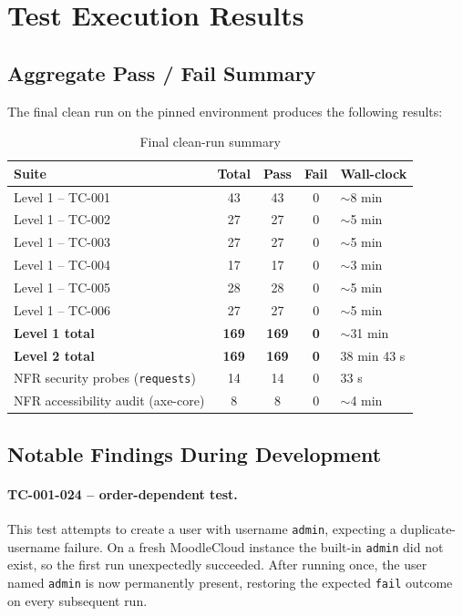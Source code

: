 \documentclass[twoside,final]{hcmut-report}
\begin{document}
\section{Test Execution Results}

\subsection{Aggregate Pass / Fail Summary}
The final clean run on the pinned environment produces the following results:

\begin{table}[H]
\centering
\renewcommand{\arraystretch}{1.3}
\begin{tabularx}{\textwidth}{|l|c|c|c|X|}
\hline
\textbf{Suite} & \textbf{Total} & \textbf{Pass} & \textbf{Fail} & \textbf{Wall-clock} \\ \hline
Level 1 -- TC-001 & 43 & 43 & 0 & $\sim$8 min \\ \hline
Level 1 -- TC-002 & 27 & 27 & 0 & $\sim$5 min \\ \hline
Level 1 -- TC-003 & 27 & 27 & 0 & $\sim$5 min \\ \hline
Level 1 -- TC-004 & 17 & 17 & 0 & $\sim$3 min \\ \hline
Level 1 -- TC-005 & 28 & 28 & 0 & $\sim$5 min \\ \hline
Level 1 -- TC-006 & 27 & 27 & 0 & $\sim$5 min \\ \hline
\textbf{Level 1 total} & \textbf{169} & \textbf{169} & \textbf{0} & $\sim$31 min \\ \hline
\textbf{Level 2 total} & \textbf{169} & \textbf{169} & \textbf{0} & 38 min 43 s \\ \hline
NFR security probes (\texttt{requests}) & 14 & 14 & 0 & 33 s \\ \hline
NFR accessibility audit (axe-core) & 8 & 8 & 0 & $\sim$4 min \\ \hline
\end{tabularx}
\caption{Final clean-run summary}
\end{table}

\subsection{Notable Findings During Development}

\paragraph{TC-001-024 -- order-dependent test.}
This test attempts to create a user with username \texttt{admin}, expecting a duplicate-username failure. On a fresh MoodleCloud instance the built-in \texttt{admin} did not exist, so the first run unexpectedly succeeded. After running once, the user named \texttt{admin} is now permanently present, restoring the expected \texttt{fail} outcome on every subsequent run.
\end{document}
